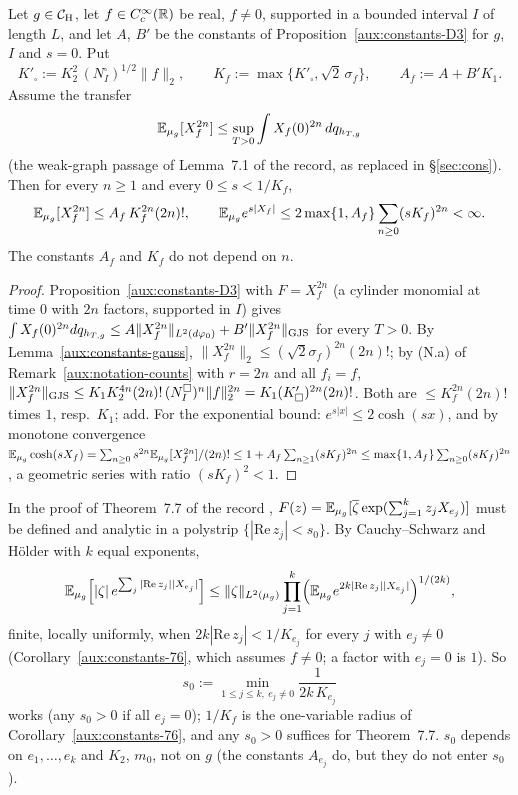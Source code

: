 \begin{auxcor}\label{aux:constants-76}
Let $g\in\mathcal{C}_{\mathrm H}$, let $f\in C_c^\infty(\mathbb{R})$ be real, $f\ne0$, supported in a bounded interval $I$
of length $L$, and let $A$, $B'$ be the constants of Proposition~\ref{aux:constants-D3} for
$g$, $I$ and $s=0$.  Put
\[
 K'_\square:=K_2^2\,(N^{\square}_I)^{1/2}\|f\|_2,\qquad K_f:=\max\{K'_\square,\sqrt2\,\sigma_f\},
 \qquad A_f:=A+B'K_1 .
\]
Assume the transfer
\[
 \mathbb{E}_{\mu_g}[X_f^{2n}]\le\sup_{T>0}\int X_f(0)^{2n}\,dq_{h_{T,g}}
\]
(the weak-graph passage of Lemma~7.1 of the record, as replaced in \S\ref{sec:cons}).  Then for
every $n\ge1$ and every $0\le s<1/K_f$,
\[
 \mathbb{E}_{\mu_g}[X_f^{2n}]\le A_f\,K_f^{2n}(2n)!,\qquad
 \mathbb{E}_{\mu_g}e^{s|X_f|}\le2\max\{1,A_f\}\sum_{n\ge0}(sK_f)^{2n}<\infty .
\]
The constants $A_f$ and $K_f$ do not depend on $n$.
\end{auxcor}

\begin{proof}
Proposition~\ref{aux:constants-D3} with $F=X_f^{2n}$ (a cylinder monomial at time $0$ with $2n$
factors, supported in $I$) gives
$\int X_f(0)^{2n}dq_{h_{T,g}}\le A\|X_f^{2n}\|_{L^2(d\varphi_0)}+B'\lVert X_f^{2n}\rVert_{\mathrm{GJS}}$ for every $T>0$.
By Lemma~\ref{aux:constants-gauss}, $\|X_f^{2n}\|_2\le(\sqrt2\sigma_f)^{2n}(2n)!$; by (N.a) of
Remark~\ref{aux:notation-counts} with $r=2n$ and all $f_i=f$,
$\lVert X_f^{2n}\rVert_{\mathrm{GJS}}\le K_1K_2^{4n}(2n)!\,(N^{\square}_I)^n\|f\|_2^{2n}=K_1(K'_\square)^{2n}(2n)!$.
Both are $\le K_f^{2n}(2n)!$ times $1$, resp.\ $K_1$; add.  For the exponential bound:
$e^{s|x|}\le2\cosh(sx)$, and by monotone convergence
$\mathbb{E}_{\mu_g}\cosh(sX_f)=\sum_{n\ge0}s^{2n}\mathbb{E}_{\mu_g}[X_f^{2n}]/(2n)!\le1+A_f\sum_{n\ge1}(sK_f)^{2n}
\le\max\{1,A_f\}\sum_{n\ge0}(sK_f)^{2n}$, a geometric series with ratio $(sK_f)^2<1$.
\end{proof}

\begin{auxrem}\label{aux:constants-s0}
In the proof of Theorem~7.7 of the record \cite[p.~23]{R}, $F(z)=\mathbb{E}_{\mu_g}[\overline\zeta
\exp(\sum_{j=1}^kz_jX_{e_j})]$ must be defined and analytic in a polystrip
$\{|\mathrm{Re}\,z_j|<s_0\}$.  By Cauchy--Schwarz and H\"older with $k$ equal exponents,
\[
 \mathbb{E}_{\mu_g}\Bigl[|\zeta|\,e^{\sum_j|\mathrm{Re}\,z_j||X_{e_j}|}\Bigr]\le\|\zeta\|_{L^2(\mu_g)}
 \prod_{j=1}^k\Bigl(\mathbb{E}_{\mu_g}e^{2k|\mathrm{Re}\,z_j||X_{e_j}|}\Bigr)^{1/(2k)} ,
\]
finite, locally uniformly, when $2k|\mathrm{Re}\,z_j|<1/K_{e_j}$ for every $j$ with
$e_j\ne0$ (Corollary~\ref{aux:constants-76}, which assumes $f\ne0$; a factor with $e_j=0$ is
$1$).  So
\[
 s_0:=\min_{1\le j\le k,\ e_j\ne0}\frac1{2k\,K_{e_j}}
\]
works (any $s_0>0$ if all $e_j=0$); $1/K_f$ is the one-variable radius of Corollary~\ref{aux:constants-76}, and any
$s_0>0$ suffices for Theorem~7.7.  $s_0$ depends on $e_1,\dots,e_k$ and $K_2$, $m_0$, not on
$g$ (the constants $A_{e_j}$ do, but they do not enter $s_0$).
\end{auxrem}


